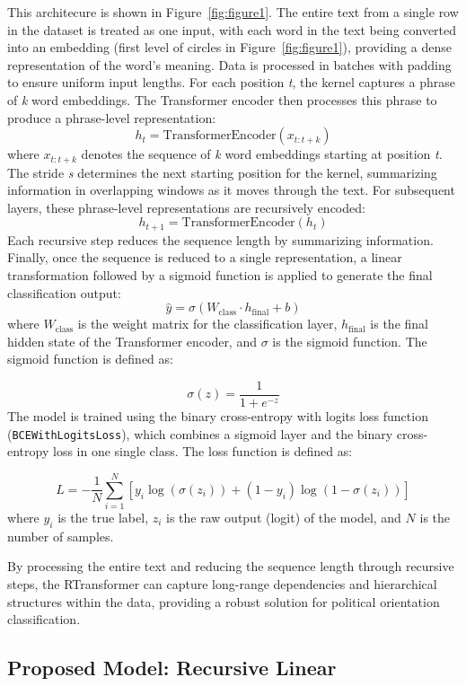 \documentclass[10pt, a4paper]{article}
\begin{document}
This architecure is shown in Figure~\ref{fig:figure1}. The entire text from a single row in the dataset is treated as one input, with each word in the text being converted into an embedding (first level of circles in Figure~\ref{fig:figure1}), providing a dense representation of the word's meaning. Data is processed in batches with padding to ensure uniform input lengths. For each position \textit{t}, the kernel captures a phrase of \textit{k} word embeddings. The Transformer encoder then processes this phrase to produce a phrase-level representation:
\[
h_{t} = \text{TransformerEncoder}(x_{t:t+k})
\]
where \(\mathit{x}_{t:t+k}\) denotes the sequence of \textit{k} word embeddings starting at position \textit{t}. The stride \textit{s} determines the next starting position for the kernel, summarizing information in overlapping windows as it moves through the text. For subsequent layers, these phrase-level representations are recursively encoded:
\[
h_{t+1} = \text{TransformerEncoder}(h_{t})
\]
Each recursive step reduces the sequence length by summarizing information. Finally, once the sequence is reduced to a single representation, a linear transformation followed by a sigmoid function is applied to generate the final classification output:
\[
\hat{y} = \sigma(W_{\text{class}} \cdot h_{\text{final}} + b)
\]
where \( W_{\text{class}} \) is the weight matrix for the classification layer, \( h_{\text{final}} \) is the final hidden state of the Transformer encoder, and \( \sigma \) is the sigmoid function. The sigmoid function is defined as:

\[
\sigma(z) = \frac{1}{1 + e^{-z}}
\]
The model is trained using the binary cross-entropy with logits loss function (\texttt{BCEWithLogitsLoss}), which combines a sigmoid layer and the binary cross-entropy loss in one single class. The loss function is defined as:

\[
L = -\frac{1}{N} \sum_{i=1}^{N} \left[ y_{i} \log(\sigma(z_{i})) + (1 - y_{i}) \log(1 - \sigma(z_{i})) \right]
\]
where \( y_{i} \) is the true label, \( z_{i} \) is the raw output (logit) of the model, and \( N \) is the number of samples.


By processing the entire text and reducing the sequence length through recursive steps, the RTransformer can capture long-range dependencies and hierarchical structures within the data, providing a robust solution for political orientation classification.

\subsection{Proposed Model: Recursive Linear} 
\end{document}
